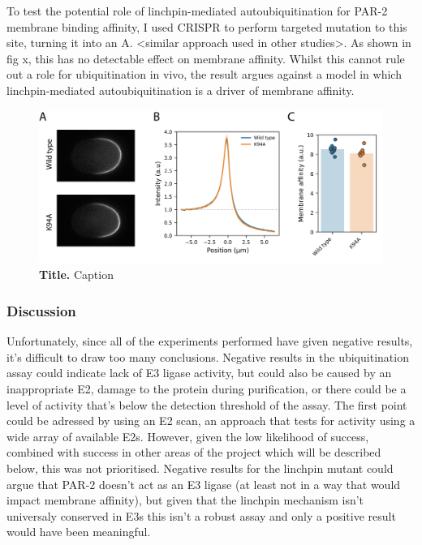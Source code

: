 \documentclass[12pt]{"article"}
\newcommand{\mycaption}[2]{\caption[#1]{\textbf{#1.} #2}}
\begin{document}
To test the potential role of linchpin-mediated autoubiquitination for PAR-2 membrane binding affinity, I used CRISPR to perform targeted mutation to this site, turning it into an A. <similar approach used in other studies>. As shown in fig x, this has no detectable effect on membrane affinity. Whilst this cannot rule out a role for ubiquitination in vivo, the result argues against a model in which linchpin-mediated autoubiquitination is a driver of membrane affinity. \\


\begin{figure}[!h]
\includegraphics[scale=0.9]{linchpin_in_vivo}
\setlength{\abovecaptionskip}{20pt}
\centering
\mycaption{Title}{Caption}
\label{fig:linchpin_in_vivo}
\end{figure}

\subsubsection{Discussion}

Unfortunately, since all of the experiments performed have given negative results, it's difficult to draw too many conclusions. Negative results in the ubiquitination assay could indicate lack of E3 ligase activity, but could also be caused by an inappropriate E2, damage to the protein during purification, or there could be a level of activity that's below the detection threshold of the assay. The first point could be adressed by using an E2 scan, an approach that tests for activity using a wide array of available E2s. However, given the low likelihood of success, combined with success in other areas of the project which will be described below, this was not prioritised. Negative results for the linchpin mutant could argue that PAR-2 doesn't act as an E3 ligase (at least not in a way that would impact membrane affinity), but given that the linchpin mechanism isn't universaly conserved in E3s this isn't a robust assay and only a positive result would have been meaningful.\\
\end{document}
